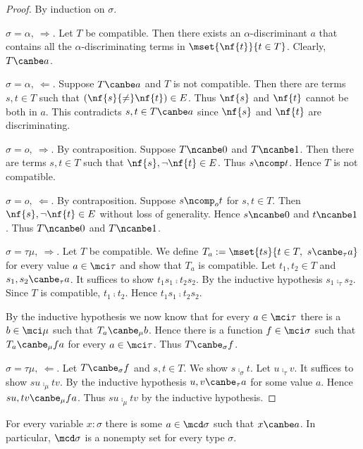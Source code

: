 \begin{proof}
  By induction on $\sigma$.  

  \br $\sigma=\alpha,~{\Rightarrow}$.  Let $T$ be
  compatible.  Then there exists an
  $\alpha$-discriminant $a$ that contains all the
  $\alpha$-discriminating terms in $\mset{\nf{t}}{t\in T}$.  
  Clearly, $T\canbe a$. 

  \br $\sigma=\alpha,~{\Leftarrow}$. 
  Suppose $T\canbe a$ and $T$ is not compatible.  Then there
  are terms $s,t\in T$ such that
  $(\nf{s}{\neq}\nf{t})\in E$.  Thus $\nf{s}$ and
  $\nf{t}$ cannot be both in $a$.  This contradicts
  $s,t\in T\canbe a$ since $\nf{s}$ and $\nf{t}$ are
  discriminating.

  \br $\sigma=o,~{\Rightarrow}$.  By contraposition.
  Suppose $T\ncanbe0$ and $T\ncanbe1$. Then there are
  terms $s,t\in T$ such that $\nf{s},\neg\nf{t}\in E$.
  Thus $s\ncomp t$.  Hence $T$ is not compatible.

  \br $\sigma=o,~{\Leftarrow}$.  By contraposition.
  Suppose $s\ncomp_o t$ for $s,t\in T$.  Then
  $\nf{s},\neg\nf{t}\in E$ without loss of generality.
  Hence $s\ncanbe0$ and $t\ncanbe1$.  Thus $T\ncanbe0$
  and $T\ncanbe1$.

  \br $\sigma=\tau\mu,~{\Rightarrow}$.  Let $T$ be
  compatible.  We define $T_a:=\mset{ts}{t\in
    T,~s\canbe_\tau a}$ for every value $a\in\mci\tau$
  and show that $T_a$ is compatible.  Let $t_1,t_2\in
  T$ and $s_1,s_2\canbe_\tau a$.  It suffices to show
  $t_1s_1\comp t_2s_2$.  By the inductive hypothesis
  $s_1\comp_\tau s_2$.
  Since $T$ is compatible, $t_1\comp t_2$.
  Hence $t_1s_1\comp t_2s_2$.


  By the inductive hypothesis we now know that for
  every $a\in\mci\tau$ there is a $b\in\mci\mu$ such
  that $T_a\canbe_\mu b$.  Hence there is a function
  $f\in\mci\sigma$ such that $T_a\canbe_\mu fa$ for
  every $a\in\mci\tau$.  Thus $T\canbe_\sigma f$.

  \br $\sigma=\tau\mu,~{\Leftarrow}$.  Let
  $T\canbe_\sigma f$ and $s,t\in T$.  We show
  $s\comp_\sigma t$.  Let $u\comp_\tau v$.  It suffices
  to show $su\comp_\mu tv$.  By the inductive hypothesis
  $u,v\canbe_\tau a$ for some value $a$.  Hence
  $su,tv\canbe_\mu fa$.  Thus $su\comp_\mu tv$ by
  the inductive hypothesis.
\end{proof}

\begin{lem}[Admissibility]
  \label{lemma-inhabitation}
  For every variable $x:\sigma$ there is some $a\in\mcd\sigma$
  such that $x\canbe a$.  In particular,
  $\mcd\sigma$ is a nonempty set for every type
  $\sigma$.
\end{lem}

